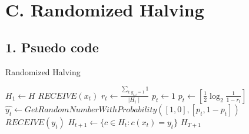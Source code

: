 \documentclass{article}
\begin{document}
\newpage

\section*{C. Randomized Halving}
\subsection*{1. Psuedo code}

\begin{algorithm}
  \caption{Randomized Halving}\label{euclid}
  \begin{algorithmic}[1]
    \State{} $ H_{1} \gets H$
    \State{} $RECEIVE(x_{t})$
    \State{} \( r_{t} \gets{} \frac{\sum_{i:y_{t,i} = 1} 1}{\mid H_{t} \mid}  \)
    \State{} \( p_{t} \gets{} 1 \)
    \State{} \( p_{t} \gets{} [\frac{1}{2} \log_2{\frac{1}{1- r_{t}}} ] \)
    \EndIf{}
    \State{} \( \hat{y_{t}} \gets{} GetRandomNumberWithProbability([1, 0], [p_{t}, 1-p_{t}]) \)
    \State{} $RECEIVE(y_{t})$
    \State{} \( H_{t+1}  \gets{} \{ c \in H_{t}: c(x_{t}) = y_{t} \}\)
    \EndIf{}
    \EndFor{}
    \Return{} $H_{T+1} $
  \end{algorithmic}
\end{algorithm}
\end{document}
